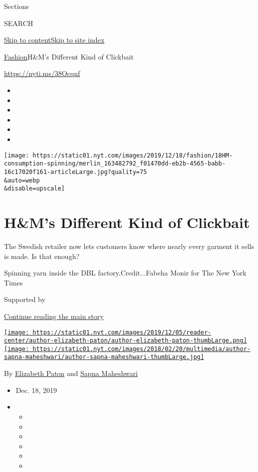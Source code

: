 Sections

SEARCH

\protect\hyperlink{site-content}{Skip to
content}\protect\hyperlink{site-index}{Skip to site index}

\href{/section/fashion}{Fashion}\textbar{}H\&M's Different Kind of
Clickbait

\url{https://nyti.ms/38Ocqnf}

\begin{itemize}
\item
\item
\item
\item
\item
\item
\end{itemize}

\texttt{[image: https://static01.nyt.com/images/2019/12/18/fashion/18HM-consumption-spinning/merlin\_163482792\_f01470dd-eb2b-4565-babb-16c17020f161-articleLarge.jpg?quality=75\\\&auto=webp\\\&disable=upscale]}

\hypertarget{hms-different-kind-of-clickbait}{%
\section{H\&M's Different Kind of
Clickbait}\label{hms-different-kind-of-clickbait}}

The Swedish retailer now lets customers know where nearly every garment
it sells is made. Is that enough?

Spinning yarn inside the DBL factory.Credit...Fabeha Monir for The New
York Times

Supported by

\protect\hyperlink{after-sponsor}{Continue reading the main story}

\href{https://www.nytimes.com/by/elizabeth-paton}{\texttt{[image: https://static01.nyt.com/images/2019/12/05/reader-center/author-elizabeth-paton/author-elizabeth-paton-thumbLarge.png]}}\href{https://www.nytimes.com/by/sapna-maheshwari}{\texttt{[image: https://static01.nyt.com/images/2018/02/20/multimedia/author-sapna-maheshwari/author-sapna-maheshwari-thumbLarge.jpg]}}

By \href{https://www.nytimes.com/by/elizabeth-paton}{Elizabeth Paton}
and \href{https://www.nytimes.com/by/sapna-maheshwari}{Sapna Maheshwari}

\begin{itemize}
\item
  Dec. 18, 2019
\item
  \begin{itemize}
  \item
  \item
  \item
  \item
  \item
  \item
  \end{itemize}
\end{itemize}

